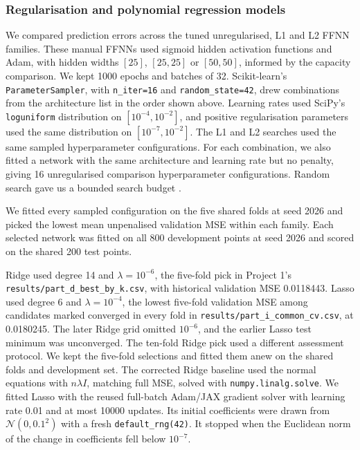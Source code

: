 \subsubsection{Regularisation and polynomial regression models}
\label{app:regularisation-search}
We compared prediction errors across the tuned unregularised, L1 and L2
FFNN families. These manual
FFNNs used sigmoid hidden activation functions and Adam, with hidden widths
$[25]$, $[25,25]$ or $[50,50]$, informed by the capacity comparison. We kept
1000 epochs and batches of 32. Scikit-learn's \nolinkurl{ParameterSampler},
with \nolinkurl{n_iter=16} and \nolinkurl{random_state=42}, drew combinations
from the architecture list in the order shown above. Learning rates used SciPy's
\nolinkurl{loguniform} distribution on $[10^{-4},10^{-2}]$, and positive
regularisation parameters used the same distribution on $[10^{-7},10^{-2}]$.
The L1 and L2 searches used the same sampled hyperparameter configurations.
For each combination, we also fitted a network with the same architecture
and learning rate but no penalty, giving 16 unregularised comparison hyperparameter configurations. Random search gave us a bounded
search budget \parencite{bergstra2012random}.

We fitted every sampled configuration on the five shared folds at
seed 2026 and picked the lowest mean unpenalised validation MSE within
each family. Each selected network was fitted on all 800 development
points at seed 2026 and scored on the shared 200 test points.

Ridge used degree 14 and $\lambda=10^{-6}$, the five-fold pick in
Project 1's \nolinkurl{results/part_d_best_by_k.csv}, with historical
validation MSE 0.0118443. Lasso used degree 6 and $\lambda=10^{-4}$,
the lowest five-fold validation MSE among candidates marked converged
in every fold in \nolinkurl{results/part_i_common_cv.csv}, at 0.0180245.
The later Ridge grid omitted $10^{-6}$, and the earlier Lasso test
minimum was unconverged. The ten-fold Ridge pick used a different
assessment protocol. We kept the five-fold selections and fitted them
anew on the shared folds and development set. The corrected Ridge baseline used the normal
equations with $n\lambda I$, matching full MSE, solved with
\nolinkurl{numpy.linalg.solve}. We fitted Lasso with the reused full-batch Adam/JAX gradient solver with learning rate 0.01 and at most 10000 updates. Its initial
coefficients were drawn from $\mathcal N(0,0.1^2)$ with a fresh
\nolinkurl{default_rng(42)}. It stopped when the Euclidean norm of the
change in coefficients fell below $10^{-7}$.

